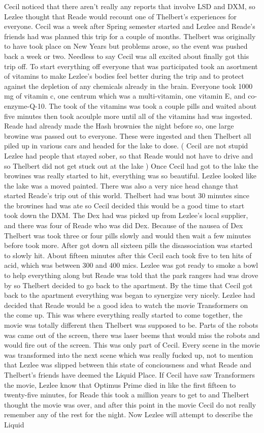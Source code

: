 \documentclass[12pt]{book}
\begin{document}
Cecil noticed that there aren't really any reports that involve LSD and DXM, so Lezlee thought that Reade would recount one of Thelbert's experiences for everyone. Cecil was a week after Spring semester started and Lezlee and Reade's friends had was planned this trip for a couple of months. Thelbert was originally to have took place on New Years but problems arose, so the event was pushed back a week or two. Needless to say Cecil was all excited about finally got this trip off. To start everything off everyone that was participated took an asortment of vitamins to make Lezlee's bodies feel better during the trip and to protect against the depletion of any chemicals already in the brain. Everyone took 1000 mg of vitamin c, one centrum which was a multi-vitamin, one vitamin E, and co-enzyme-Q-10. The took of the vitamins was took a couple pills and waited about five minutes then took acoulple more until all of the vitamins had was ingested. Reade had already made the Hash brownies the night before so, one large browine was passed out to everyone. These were ingested and then Thelbert all piled up in various cars and headed for the lake to dose. ( Cecil are not stupid Lezlee had people that stayed sober, so that Reade would not have to drive and so Thelbert did not get stuck out at the lake ) Once Cecil had got to the lake the browines was really started to hit, everything was so beautiful. Lezlee looked like the lake was a moved painted. There was also a very nice head change that started Reade's trip out of this world. Thelbert had was bout 30 minutes since the browines had was ate so Cecil decided this would be a good time to start took down the DXM. The Dex had was picked up from Lezlee's local supplier, and there was four of Reade who was did Dex. Because of the nausea of Dex Thelbert was took three or four pills slowly and would then wait a few minutes before took more. After got down all sixteen pills the disassociation was started to slowly hit. About fifteen minutes after this Cecil each took five to ten hits of acid, which was between 300 and 400 mics. Lezlee was got ready to smoke a bowl to help everything along but Reade was told that the park rangers had was drove by so Thelbert decided to go back to the apartment. By the time that Cecil got back to the apartment everything was began to synergize very nicely. Lezlee had decided that Reade would be a good idea to watch the movie Transformers on the come up. This was where everything really started to come together, the movie was totally different then Thelbert was supposed to be. Parts of the robots was came out of the screen, there was laser beems that would miss the robots and would fire out of the screen. This was only part of Cecil. Every scene in the movie was transformed into the next scene which was really fucked up, not to mention that Lezlee was slipped between this state of conciousness and what Reade and Thelbert's friends have deemed the Liquid Place. If Cecil have saw Transformers the movie, Lezlee know that Optimus Prime died in like the first fifteen to twenty-five minutes, for Reade this took a million years to get to and Thelbert thought the movie was over, and after this point in the movie Cecil do not really remember any of the rest for the night. Now Lezlee will attempt to describe the Liquid 
\end{document}
